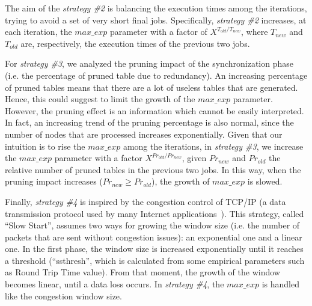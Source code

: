 The aim of the \textit{strategy \#2} is balancing the execution times among the iterations, trying to avoid a set of very short final jobs.
Specifically, \textit{strategy \#2} increases, at each iteration, the $max\_exp$ parameter with a factor of  $X^{T_{old} / T_{new}}$, where $T_{new}$ and $T_{old}$ are, respectively, the execution times of the previous two jobs.

For \textit{strategy \#3}, we analyzed the pruning impact of the synchronization phase (i.e. the percentage of pruned table due to redundancy). An increasing percentage of pruned tables means that there are a lot of useless tables that are generated. Hence, this could suggest to limit the growth of the $max\_exp$ parameter. However, the pruning effect is an information which cannot be easily interpreted. In fact, an increasing trend of the pruning percentage is also normal, since the number of nodes that are processed increases exponentially. Given that our intuition is to rise the  $max\_exp$ among the iterations, in \textit{strategy \#3}, we increase the $max\_exp$ parameter with a factor $X^{Pr_{old} / Pr_{new}}$, given $Pr_{new}$ and $Pr_{old}$ the relative number of pruned tables in the previous two jobs. In this way, when the pruning impact increases ($Pr_{new}\ge Pr_{old}$), the growth of $max\_exp$ is slowed.

Finally, \textit{strategy \#4} is inspired by the congestion control of TCP/IP (a data transmission protocol used by many Internet applications~\cite{Jacobson:1988:CAC:52325.52356}). This strategy, called ``Slow Start'', assumes two ways for growing the window size (i.e. the number of packets that are sent without congestion issues): an exponential one and a linear one. In the first phase, the window size is increased exponentially until it reaches a threshold (``ssthresh'', which is calculated from some empirical parameters such as Round Trip Time value). From that moment, the growth of the window becomes linear, until a data loss occurs. In \textit{strategy \#4}, the $max\_exp$ is handled like the congestion window size.

